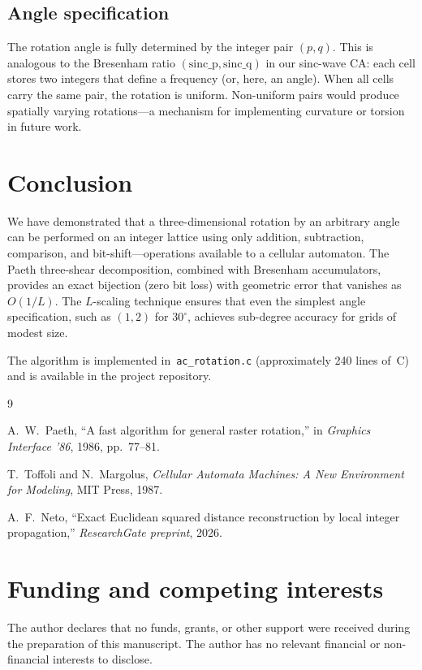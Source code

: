 \documentclass[12pt,a4paper]{article}
\begin{document}
\subsection{Angle specification}

The rotation angle is fully determined by the integer pair
$(p,q)$.  This is analogous to the Bresenham ratio
$(\mathrm{sinc\_p}, \mathrm{sinc\_q})$ in our sinc-wave CA: each
cell stores two integers that define a frequency (or, here, an
angle).  When all cells carry the same pair, the rotation is
uniform.  Non-uniform pairs would produce spatially varying
rotations---a mechanism for implementing curvature or torsion in
future work.

\section{Conclusion}
\label{sec:conclusion}

We have demonstrated that a three-dimensional rotation by an
arbitrary angle can be performed on an integer lattice using only
addition, subtraction, comparison, and bit-shift---operations
available to a cellular automaton.  The Paeth three-shear
decomposition, combined with Bresenham accumulators, provides an
exact bijection (zero bit loss) with geometric error that vanishes
as $O(1/L)$.  The $L$-scaling technique ensures that even the
simplest angle specification, such as $(1,2)$ for $30^\circ$, achieves
sub-degree accuracy for grids of modest size.

The algorithm is implemented in~\texttt{ac\_rotation.c}
(approximately 240 lines of~C) and is available in the project
repository.

\begin{thebibliography}{9}

A.~W.\ Paeth,
``A fast algorithm for general raster rotation,''
in \emph{Graphics Interface '86}, 1986, pp.~77--81.

T.~Toffoli and N.~Margolus,
\emph{Cellular Automata Machines: A New Environment for Modeling},
MIT Press, 1987.

A.~F.~Neto,
``Exact Euclidean squared distance reconstruction by local integer
propagation,''
\emph{ResearchGate preprint}, 2026.

\end{thebibliography}

\section*{Funding and competing interests}

The author declares that no funds, grants, or other support were received
during the preparation of this manuscript.
The author has no relevant financial or non-financial interests to disclose.
\end{document}
